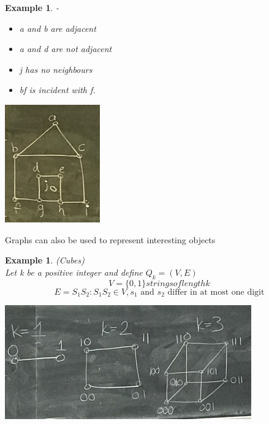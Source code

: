 \documentclass{article}
\newtheorem{ex}[theorem]{Example}
\begin{document}
\begin{ex}-\\
\begin{itemize}
\item a and b are adjacent 
\item a and d are not adjacent 
\item j has no neighbours 
\item bf  is incident with f.
\end{itemize}
\begin{center}
\includegraphics[scale=0.5]{2}
\end{center}
\end{ex}

Graphs can also be used to represent interesting objects 

\begin{ex}(Cubes) \\
Let k be a positive integer and define \(Q_k = (V,E)\)
\[V = \{0,1\} strings of length k\]
\[E = S_1 S_2 : S_1 S_2 \in V, s_1 \text{ and } s_2 \text{ differ in at most one digit}\]
\begin{center}
\includegraphics[scale=0.5]{3}
\end{center}
\end{ex}
\end{document}
